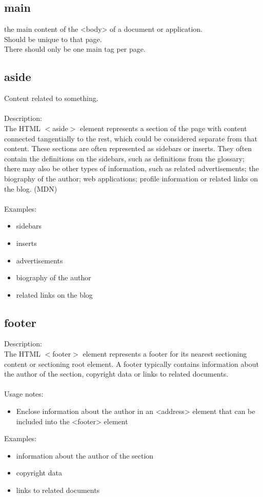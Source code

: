 \documentclass[]{article}
\newcommand{\<}{\guilsinglleft}
\renewcommand{\>}{\guilsinglright}
\begin{document}
\subsection{main}
the main content of the <body> of a document or application.
\\
Should be unique to that page.
\\
There should only be one main tag per page.

\subsection{aside}
Content related to something.
\\\\
Description:
\\
The HTML $<$aside$>$ element represents a section of the page with content connected tangentially to the rest, which could be considered separate from that content. These sections are often represented as sidebars or inserts. They often contain the definitions on the sidebars, such as definitions from the glossary; there may also be other types of information, such as related advertisements; the biography of the author; web applications; profile information or related links on the blog. (MDN)
\\\\
Examples:
\begin{itemize}
	\item sidebars
	\item inserts
	\item advertisements
	\item biography of the author
	\item related links on the blog
\end{itemize}


\subsection{footer}
Description:
\\
The HTML $<$footer$>$ element represents a footer for its nearest sectioning content or sectioning root element. A footer typically contains information about the author of the section, copyright data or links to related documents.
\\\\
Usage notes:
\begin{itemize}
	\item Enclose information about the author in an <address> element that can be included into the <footer> element 
\end{itemize}
Examples:
\begin{itemize}
	\item information about the author of the section
	\item copyright data
	\item links to related documents
\end{itemize}
\end{document}
